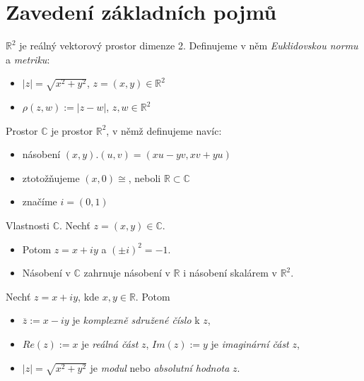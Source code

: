 \section{\texorpdfstring{Zavedení základních pojmů}{Zavedení základních pojmu}}
\vspace{5mm}
\large


\textbf{$\mathbb{R}^2$} je reálný vektorový prostor dimenze 2. Definujeme v něm \emph{Euklidovskou normu} a \emph{metriku}:
\begin{itemize}
    \item $|z| = \sqrt{x^2+y^2}$, $z = (x,y)\in\mathbb{R}^2$
    \item $\rho(z,w):= |z-w|$, $z,w\in\mathbb{R}^2$
\end{itemize}

\begin{definition}
Prostor $\mathbb{C}$ je prostor $\mathbb{R}^2$, v němž definujeme navíc:
\begin{itemize}
    \item násobení $(x,y).(u,v) = (xu-yv, xv+yu)$
    \item ztotožňujeme $(x,0) \cong$, neboli $\mathbb{R}\subset\mathbb{C}$
    \item značíme $i = (0,1)$
\end{itemize}
\end{definition}

\begin{properties}
Vlastnosti $\mathbb{C}$. Nechť $z = (x,y)\in\mathbb{C}$.
\begin{itemize}
    \item Potom $z = x+iy$ a $(\pm i)^2 = -1$.
    \item Násobení v $\mathbb{C}$ zahrnuje násobení v $\mathbb{R}$ i násobení skalárem v $\mathbb{R}^2$.
\end{itemize}
\end{properties}


\begin{notation}
Nechť $z = x+iy$, kde $x,y\in\mathbb{R}$. Potom
\begin{itemize}
    \item $\overline{z}:= x-iy$ je \textit{komplexně sdružené číslo} k $z$,
    \item $Re(z):= x$ je \textit{reálná část} $z$, $Im(z):= y$ je \textit{imaginární část} $z$,
    \item $|z| = \sqrt{x^2+y^2}$ je \textit{modul} nebo \textit{absolutní hodnota} $z$.
\end{itemize}
\end{notation} 

